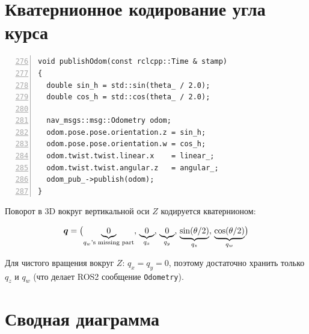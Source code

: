 \section{Кватернионное кодирование угла курса}

\begin{filebox}[title={\filepath{motor\_node.cpp}, строки 276--291 --- publishOdom()}]
\begin{lstlisting}[style=cppstyle, numbers=left, firstnumber=276]
void publishOdom(const rclcpp::Time & stamp)
{
  double sin_h = std::sin(theta_ / 2.0);
  double cos_h = std::cos(theta_ / 2.0);

  nav_msgs::msg::Odometry odom;
  odom.pose.pose.orientation.z = sin_h;
  odom.pose.pose.orientation.w = cos_h;
  odom.twist.twist.linear.x    = linear_;
  odom.twist.twist.angular.z   = angular_;
  odom_pub_->publish(odom);
}
\end{lstlisting}
\end{filebox}

Поворот в 3D вокруг вертикальной оси $Z$ кодируется кватернионом:

\begin{equation}
  \bm{q} = \bigl(\underbrace{0}_{q_w\text{'s missing part}},\,
  \underbrace{0}_{q_x},\,
  \underbrace{0}_{q_y},\,
  \underbrace{\sin(\theta/2)}_{q_z},\,
  \underbrace{\cos(\theta/2)}_{q_w}\bigr)
  \label{eq:quaternion_yaw}
\end{equation}

Для чистого вращения вокруг $Z$: $q_x = q_y = 0$, поэтому достаточно
хранить только $q_z$ и $q_w$ (что делает ROS2 сообщение \texttt{Odometry}).

\section{Сводная диаграмма}

\begin{center}
\end{center}

